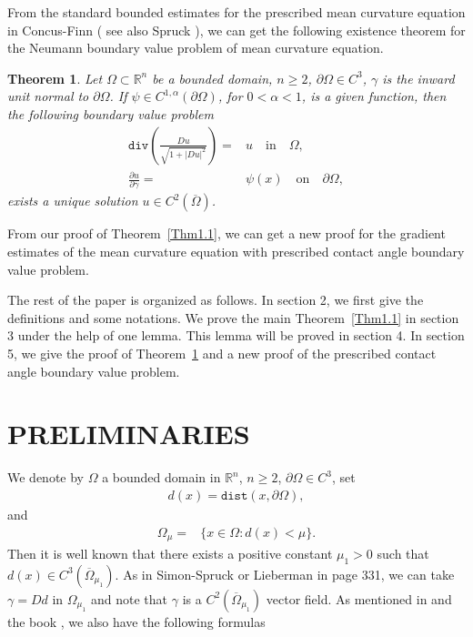 \documentclass[11pt]{amsart}
\newtheorem{Thm}{Theorem}[section]
\numberwithin{equation}{section}
\begin{document}
From the standard bounded estimates for the prescribed mean curvature equation in Concus-Finn \cite{CF74} ( see also Spruck \cite{Sp75}), we can get the following existence theorem for the Neumann boundary value problem of mean curvature equation.

\begin{Thm}\label{Thm1.2}
Let $\Omega \subset\mathbb R^n $ be a bounded domain, $n\geq 2$, $\partial \Omega\in C^{3}$, $\gamma$ is the inward unit normal to $\partial\Omega $.
If  $\psi \in C^{1,\alpha}(\partial\Omega)$, for $0<\alpha<1$,  is a given function, then the following boundary value problem
\begin{align}
 \texttt{div}(\frac{Du}{\sqrt{1+|Du|^2}}) =& u   \quad\text{in}\quad \Omega, \label{1.7}\\
              \frac{\partial u}{\partial \gamma} = &\psi(x)  \quad\text{on} \quad\partial \Omega,\label{1.8}
\end{align}
 exists a unique solution $ u \in C^2(\overline\Omega)$.
\end{Thm}

  From our proof of  Theorem~\ref{Thm1.1}, we can get a new proof for the gradient estimates of the mean curvature equation with prescribed contact angle boundary value problem.\par
The rest of the paper is organized as follows. In section 2, we first give the definitions and some notations. We prove the main Theorem~\ref{Thm1.1} in section 3 under the help of one lemma. This lemma  will be proved in section 4. In section 5, we give the proof of  Theorem~\ref{Thm1.2} and a new proof of the prescribed contact angle boundary value problem.


\section{PRELIMINARIES}
We denote by $\Omega$ a bounded  domain in $\mathbb{R}^n$, $n\geq 2$,  $\partial \Omega\in C^{3}$,   set
\begin{align*}
 d(x)=\texttt{dist}(x,\partial \Omega),
 \end{align*}
 and
\begin{align*}
 \Omega_\mu=&\{{x\in\Omega:d(x)<\mu}\}.
 \end{align*}
Then it is well known that there exists a positive constant $\mu_{1}>0$ such that $d(x) \in C^3(\overline \Omega_{\mu_{1}})$. As in Simon-Spruck \cite{SS76} or Lieberman \cite{Lieb13} in page 331,  we can take $\gamma= D d$ in $\Omega_{\mu_{1}}$ and note that  $\gamma$ is a $C^2(\overline \Omega_{\mu_{1}})$ vector field. As mentioned in \cite{Lieb88} and the book \cite{Lieb13}, we also have the following formulas
\end{document}
